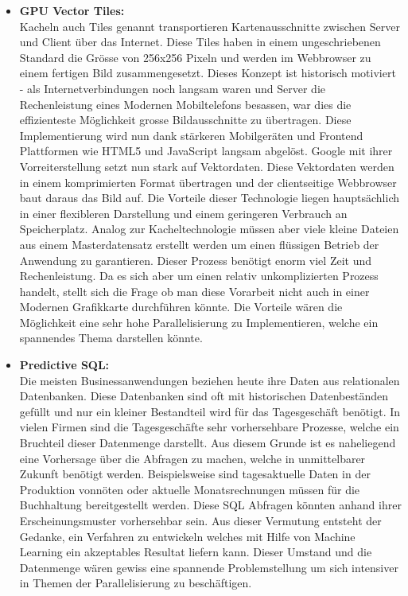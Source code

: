 \documentclass{article}
\begin{document}
\begin{itemize}
	\item{\textbf{GPU Vector Tiles:} \\
	 Kacheln auch Tiles genannt transportieren Kartenausschnitte zwischen Server und Client über das Internet. Diese Tiles haben in einem ungeschriebenen Standard die Grösse von 256x256 Pixeln und werden im Webbrowser zu einem fertigen Bild zusammengesetzt. Dieses Konzept ist historisch motiviert - als Internetverbindungen noch langsam waren und Server die Rechenleistung eines Modernen Mobiltelefons besassen, war dies die effizienteste Möglichkeit grosse Bildausschnitte zu übertragen. Diese Implementierung wird nun dank stärkeren Mobilgeräten und Frontend Plattformen wie HTML5 und JavaScript langsam abgelöst. Google mit ihrer Vorreiterstellung setzt nun stark auf Vektordaten. Diese Vektordaten werden in einem komprimierten Format übertragen und der clientseitige Webbrowser baut daraus das Bild auf. Die Vorteile dieser Technologie liegen hauptsächlich in einer flexibleren Darstellung und einem geringeren Verbrauch an Speicherplatz. Analog zur Kacheltechnologie müssen aber viele kleine Dateien aus einem Masterdatensatz erstellt werden um einen flüssigen Betrieb der Anwendung zu garantieren. Dieser Prozess benötigt enorm viel Zeit und Rechenleistung. Da es sich aber um einen relativ unkomplizierten Prozess handelt, stellt sich die Frage ob man diese Vorarbeit nicht auch in einer Modernen Grafikkarte durchführen könnte. Die Vorteile wären die Möglichkeit eine sehr hohe Parallelisierung zu Implementieren, welche ein spannendes Thema darstellen könnte.
	}

	\item{\textbf{Predictive SQL:} \\
	Die meisten Businessanwendungen beziehen heute ihre Daten aus relationalen Datenbanken. Diese Datenbanken sind oft mit historischen Datenbeständen gefüllt und nur ein kleiner Bestandteil wird für das Tagesgeschäft benötigt. In vielen Firmen sind die Tagesgeschäfte sehr vorhersehbare Prozesse, welche ein Bruchteil dieser Datenmenge darstellt. Aus diesem Grunde ist es naheliegend eine Vorhersage über die Abfragen zu machen, welche in unmittelbarer Zukunft benötigt werden. Beispielsweise sind tagesaktuelle Daten in der Produktion vonnöten oder aktuelle Monatsrechnungen müssen für die Buchhaltung bereitgestellt werden. Diese SQL Abfragen könnten anhand ihrer Erscheinungsmuster vorhersehbar sein. Aus dieser Vermutung entsteht der Gedanke, ein Verfahren zu entwickeln welches mit Hilfe von Machine Learning ein akzeptables Resultat liefern kann. Dieser Umstand und die Datenmenge wären gewiss eine spannende Problemstellung um sich intensiver in Themen der Parallelisierung zu beschäftigen.
	}
	

\end{itemize}
\end{document}
